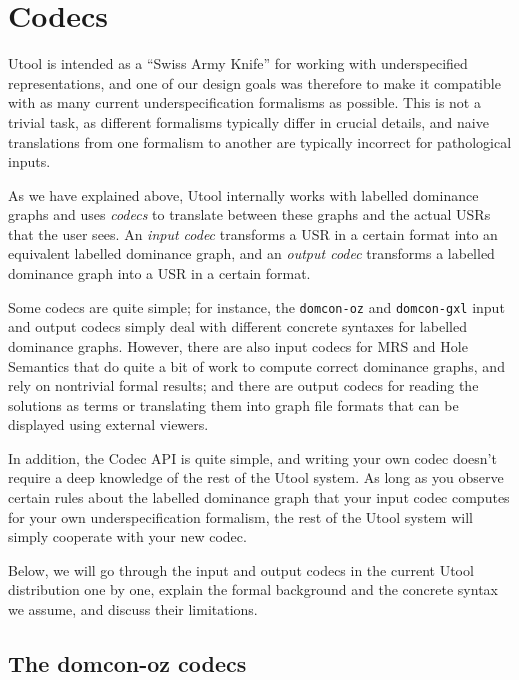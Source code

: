 \section{Codecs}  \label{sec:codecs}


Utool is intended as a ``Swiss Army Knife'' for working with
underspecified representations, and one of our design goals was
therefore to make it compatible with as many current
underspecification formalisms as possible. This is not a trivial task,
as different formalisms typically differ in crucial details, and naive
translations from one formalism to another are typically incorrect for
pathological inputs.

As we have explained above, Utool internally works with labelled
dominance graphs and uses \emph{codecs} to translate between these
graphs and the actual USRs that the user sees. An \emph{input codec}
transforms a USR in a certain format into an equivalent labelled
dominance graph, and an \emph{output codec} transforms a labelled
dominance graph into a USR in a certain format. 

Some codecs are quite simple; for instance, the \verb?domcon-oz? and
\verb?domcon-gxl? input and output codecs simply deal with different
concrete syntaxes for labelled dominance graphs. However, there are
also input codecs for MRS and Hole Semantics that do quite a bit of
work to compute correct dominance graphs, and rely on nontrivial
formal results; and there are output codecs for reading the solutions
as terms or translating them into graph file formats that can be
displayed using external viewers.

In addition, the Codec API is quite simple, and writing your own codec
doesn't require a deep knowledge of the rest of the Utool system. As
long as you observe certain rules about the labelled dominance graph
that your input codec computes for your own underspecification
formalism, the rest of the Utool system will simply cooperate with
your new codec.

Below, we will go through the input and output codecs in the current
Utool distribution one by one, explain the formal background and the
concrete syntax we assume, and discuss their limitations.



\subsection{The domcon-oz codecs}

